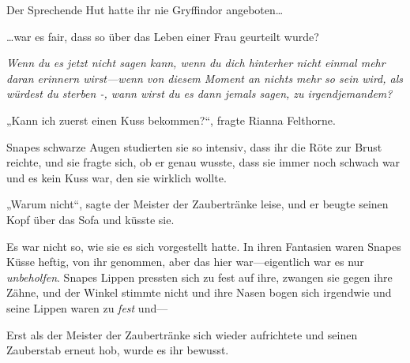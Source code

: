 Der Sprechende Hut hatte ihr nie Gryffindor angeboten…

…war es fair, dass so über das Leben einer Frau geurteilt wurde?

\emph{Wenn du es jetzt nicht sagen kann, wenn du dich hinterher nicht einmal mehr daran erinnern wirst—wenn von diesem Moment an nichts mehr so sein wird, als würdest du sterben -, wann wirst du es dann jemals sagen, zu irgendjemandem?}

„Kann ich zuerst einen Kuss bekommen?“, fragte Rianna Felthorne.

Snapes schwarze Augen studierten sie so intensiv, dass ihr die Röte zur Brust reichte, und sie fragte sich, ob er genau wusste, dass sie immer noch schwach war und es kein Kuss war, den sie wirklich wollte.

„Warum nicht“, sagte der Meister der Zaubertränke leise, und er beugte seinen Kopf über das Sofa und küsste sie.

Es war nicht so, wie sie es sich vorgestellt hatte. In ihren Fantasien waren Snapes Küsse heftig, von ihr genommen, aber das hier war—eigentlich war es nur \emph{unbeholfen}. Snapes Lippen pressten sich zu fest auf ihre, zwangen sie gegen ihre Zähne, und der Winkel stimmte nicht und ihre Nasen bogen sich irgendwie und seine Lippen waren zu \emph{fest} und—

Erst als der Meister der Zaubertränke sich wieder aufrichtete und seinen Zauberstab erneut hob, wurde es ihr bewusst.

